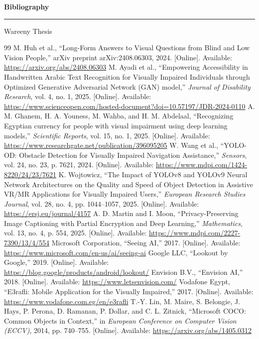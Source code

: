 \documentclass[12pt,a4paper]{report}
\newcommand{\chaptercover}[1]{%
  \clearpage
  \thispagestyle{empty}
  \vspace*{\fill}
  \begin{center}
    {\Huge\bfseries #1\par}
    \vspace{0.8cm}
    \rule{0.35\textwidth}{1pt}\par
    \vspace{0.6cm}
    {\Large Wareeny Thesis\par}
  \end{center}
  \vspace*{\fill}
  \clearpage
}
\begin{document}
\chaptercover{Bibliography}
\begin{thebibliography}{99}
   M. Huh et al., ``Long-Form Answers to Visual Questions from Blind and Low Vision People,'' arXiv preprint arXiv:2408.06303, 2024. [Online]. Available: \url{https://arxiv.org/abs/2408.06303}
   M. Ayadi et al., ``Empowering Accessibility in Handwritten Arabic Text Recognition for Visually Impaired Individuals through Optimized Generative Adversarial Network (GAN) model,'' \textit{Journal of Disability Research}, vol. 4, no. 1, 2025. [Online]. Available: \url{https://www.scienceopen.com/hosted-document?doi=10.57197/JDR-2024-0110}
   A. M. Ghanem, H. A. Youness, M. Wahba, and H. M. Abdelaal, ``Recognizing Egyptian currency for people with visual impairment using deep learning models,'' \textit{Scientific Reports}, vol. 15, no. 1, 2025. [Online]. Available: \url{https://www.researchgate.net/publication/396095205}
   W. Wang et al., ``YOLO-OD: Obstacle Detection for Visually Impaired Navigation Assistance,'' \textit{Sensors}, vol. 24, no. 23, p. 7621, 2024. [Online]. Available: \url{https://www.mdpi.com/1424-8220/24/23/7621}
   K. Wojtowicz, ``The Impact of YOLOv8 and YOLOv9 Neural Network Architectures on the Quality and Speed of Object Detection in Assistive VR/MR Applications for Visually Impaired Users,'' \textit{European Research Studies Journal}, vol. 28, no. 4, pp. 1044--1057, 2025. [Online]. Available: \url{https://ersj.eu/journal/4157}
   A. D. Martin and I. Moon, ``Privacy-Preserving Image Captioning with Partial Encryption and Deep Learning,'' \textit{Mathematics}, vol. 13, no. 4, p. 554, 2025. [Online]. Available: \url{https://www.mdpi.com/2227-7390/13/4/554}
   Microsoft Corporation, ``Seeing AI,'' 2017. [Online]. Available: \url{https://www.microsoft.com/en-us/ai/seeing-ai}
   Google LLC, ``Lookout by Google,'' 2019. [Online]. Available: \url{https://blog.google/products/android/lookout/}
   Envision B.V., ``Envision AI,'' 2018. [Online]. Available: \url{https://www.letsenvision.com/}
   Vodafone Egypt, ``E3rafli: Mobile Application for the Visually Impaired,'' 2017. [Online]. Available: \url{https://www.vodafone.com.eg/en/e3rafli}
   T.-Y. Lin, M. Maire, S. Belongie, J. Hays, P. Perona, D. Ramanan, P. Dollar, and C. L. Zitnick, ``Microsoft COCO: Common Objects in Context,'' in \textit{European Conference on Computer Vision (ECCV)}, 2014, pp. 740--755. [Online]. Available: \url{https://arxiv.org/abs/1405.0312}

\end{thebibliography}
\end{document}
